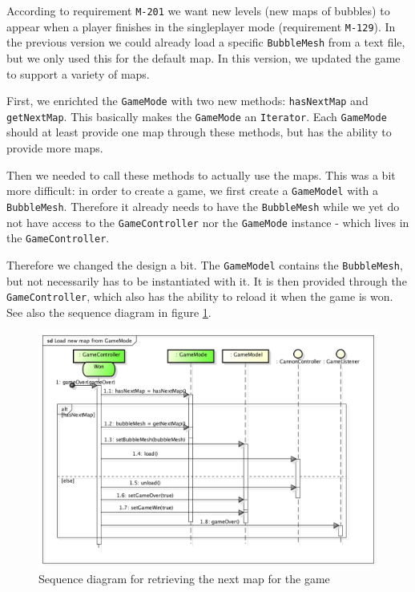 \documentclass[a4paper]{article}
\begin{document}
According to requirement \texttt{M-201} we want new levels (new maps of bubbles) to appear when a player finishes in the singleplayer mode (requirement \texttt{M-129}). In the previous version we could already load a specific \texttt{BubbleMesh} from a text file, but we only used this for the default map. In this version, we updated the game to support a variety of maps.

\par{} First, we enrichted the \texttt{GameMode} with two new methods: \texttt{hasNextMap} and \texttt{getNextMap}. This basically makes the \texttt{GameMode} an \texttt{Iterator}. Each \texttt{GameMode} should at least provide one map through these methods, but has the ability to provide more maps.

\par{} Then we needed to call these methods to actually use the maps. This was a bit more difficult: in order to create a game, we first create a \texttt{GameModel} with a \texttt{BubbleMesh}. Therefore it already needs to have the \texttt{BubbleMesh} while we yet do not have access to the \texttt{GameController} nor the \texttt{GameMode} instance - which lives in the \texttt{GameController}.

\par{} Therefore we changed the design a bit. The \texttt{GameModel} contains the \texttt{BubbleMesh}, but not necessarily has to be instantiated with it. It is then provided through the \texttt{GameController}, which also has the ability to reload it when the game is won. See also the sequence diagram in figure \ref{fig:GameModeMap}.

\begin{figure}[H]
	\centering
	\includegraphics[scale=0.4]{GameModeMap.png}
    \caption{Sequence diagram for retrieving the next map for the game}
    \label{fig:GameModeMap}
\end{figure}
\end{document}
